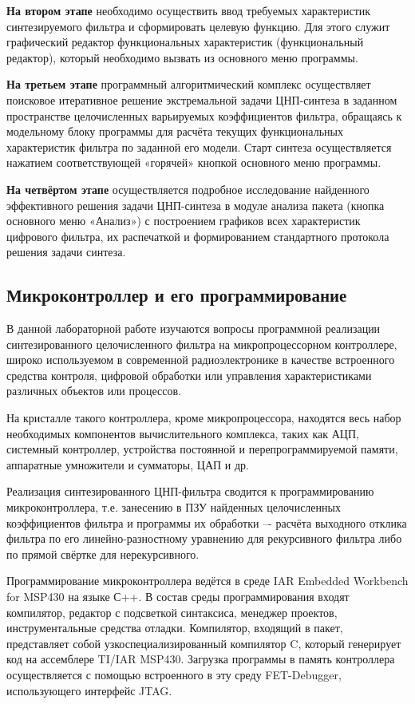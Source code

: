 \textbf{На  втором этапе} необходимо осуществить ввод требуемых характеристик синтезируемого фильтра и сформировать целевую функцию. Для этого служит графический редактор функциональных характеристик (функциональный редактор), который необходимо вызвать из основного меню программы.

\textbf{На третьем этапе} программный алгоритмический комплекс осуществляет поисковое итеративное решение экстремальной задачи ЦНП-синтеза в заданном пространстве целочисленных варьируемых коэффициентов фильтра, обращаясь к модельному блоку программы для расчёта текущих функциональных характеристик фильтра по заданной его модели. Старт синтеза осуществляется нажатием соответствующей «горячей» кнопкой основного меню программы.

\textbf{На четвёртом этапе} осуществляется подробное исследование найденного эффективного решения задачи ЦНП-синтеза в модуле анализа пакета (кнопка основного меню «Анализ») с построением графиков всех характеристик цифрового фильтра, их распечаткой и формированием стандартного протокола решения задачи синтеза.

\subsection{Микроконтроллер и его программирование}

В данной лабораторной работе изучаются вопросы программной реализации синтезированного целочисленного фильтра на микропроцессорном контроллере, широко используемом в современной радиоэлектронике в качестве встроенного средства контроля, цифровой обработки или управления характеристиками различных объектов или процессов. 

На кристалле такого контроллера, кроме микропроцессора, находятся весь набор необходимых компонентов  вычислительного комплекса, таких как АЦП, системный контроллер, устройства постоянной и перепрограммируемой памяти, аппаратные умножители и сумматоры, ЦАП и др.

Реализация синтезированного ЦНП-фильтра сводится к программированию микроконтроллера, т.е. занесению в ПЗУ найденных целочисленных коэффициентов фильтра и программы их обработки –- расчёта выходного отклика фильтра по его линейно-разностному уравнению  для рекурсивного фильтра либо по прямой свёртке для нерекурсивного.

Программирование микроконтроллера ведётся в среде IAR Emb\-edd\-ed Wo\-rkbe\-nch for MSP430 на языке С++. 
В состав среды программирования входят компилятор, редактор с подсветкой синтаксиса, менеджер проектов, инструментальные средства отладки. Компилятор, входящий в пакет, представляет собой узкоспециализированный компилятор C, который генерирует код на ассемблере TI/IAR MSP430. Загрузка программы в память контроллера осуществляется с помощью встроенного в эту среду FET-Debugger, использующего интерфейс JTAG.
\newpage



